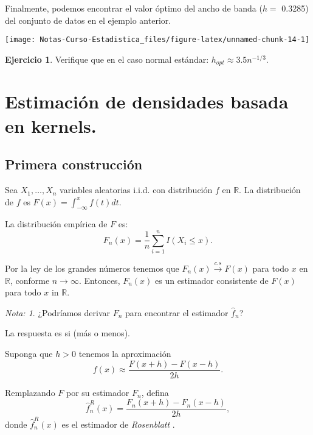 \documentclass[
  12pt,
]{book}
\theoremstyle{definition}
\theoremstyle{definition}
\theoremstyle{definition}
\newtheorem{exercise}{Ejercicio}[chapter]
\theoremstyle{definition}
\theoremstyle{remark}
\newtheorem*{remark}{Nota: }
\begin{document}
Finalmente, podemos encontrar el valor óptimo del ancho de banda (\(h=\) 0.3285) del conjunto de datos en el ejemplo anterior.

\begin{center}\texttt{[image: Notas-Curso-Estadistica\_files/figure-latex/unnamed-chunk-14-1]} \end{center}

\begin{exercise}
\protect\hypertarget{exr:unnamed-chunk-15}{}\label{exr:unnamed-chunk-15}Verifique que en el caso normal estándar: \(h_{opt}\approx 3.5 n^{-1/3}\).
\end{exercise}

\hypertarget{estimaciuxf3n-de-densidades-basada-en-kernels.}{%
\section{Estimación de densidades basada en kernels.}\label{estimaciuxf3n-de-densidades-basada-en-kernels.}}

\hypertarget{primera-construcciuxf3n}{%
\subsection{Primera construcción}\label{primera-construcciuxf3n}}

Sea \(X_{1},\ldots,X_{n}\) variables aleatorias i.i.d. con distribución \(f\) en \(\mathbb{R}\). La distribución de \(f\) es \(F(x)=\int_{-\infty}^{x}f(t)dt\).

La distribución empírica de \(F\) es:
\[
F_{n}(x)=\frac{1}{n}\sum_{i=1}^{n}I(X_{i}\leq x).
\]

Por la ley de los grandes números tenemos que \(F_{n}(x) \xrightarrow{c.s} F(x)\) para todo \(x\) en \(\mathbb{R}\), conforme
\(n\rightarrow\infty\). Entonces, \(F_{n}(x)\) es un estimador consistente de \(F(x)\) para todo \(x\) in \(\mathbb{R}\).

\begin{remark}
¿Podríamos derivar \(F_n\) para encontrar el estimador \(\hat{f}_n\)?
\end{remark}

La respuesta es si (más o menos).

Suponga que \(h>0\) tenemos la aproximación
\[
f(x)\approx\frac{F(x+h)-F(x-h)}{2h}.
\]

Remplazando \(F\) por su estimador \(F_{n}\), defina
\[
\hat{f}_{n}^{R}(x)=\frac{F_{n}(x+h)-F_{n}(x-h)}{2h},
\]
donde \(\hat{f}_{n}^{R}(x)\) es el estimador de \emph{Rosenblatt} .
\end{document}
